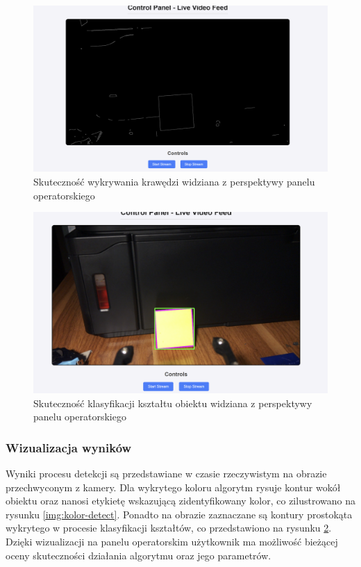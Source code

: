 \begin{figure}[H]
  \centering
  \includegraphics[width=1.0\textwidth]{./graf/krawedzie.png}
  \caption{Skuteczność wykrywania krawędzi widziana z perspektywy panelu operatorskiego}
  \label{img:krawedzie}
\end{figure}

\begin{figure}[H]
  \centering
  \includegraphics[width=1.0\textwidth]{./graf/klasyfikacja-ksztaltu.png}
  \caption{Skuteczność klasyfikacji kształtu obiektu widziana z perspektywy panelu operatorskiego}
  \label{img:klas-obj}
\end{figure}

\subsubsection{Wizualizacja wyników}

Wyniki procesu detekcji są przedstawiane w czasie rzeczywistym na obrazie przechwyconym z kamery. Dla wykrytego koloru algorytm rysuje kontur wokół obiektu oraz nanosi etykietę wskazującą zidentyfikowany kolor, co zilustrowano na rysunku \ref{img:kolor-detect}. Ponadto na obrazie zaznaczane są kontury prostokąta wykrytego w procesie klasyfikacji kształtów, co przedstawiono na rysunku \ref{img:klas-obj}. Dzięki wizualizacji na panelu operatorskim użytkownik ma możliwość bieżącej oceny skuteczności działania algorytmu oraz jego parametrów.

